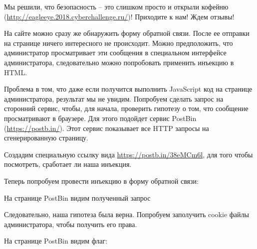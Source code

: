 
Мы решили, что безопасность – это слишком просто и открыли кофейню (\url{http://eagleeye.2018.cyberchallenge.ru/})! Приходите к нам! Ждем отзывы!

\solutionSection

На сайте можно сразу же обнаружить форму обратной связи. После ее отправки на странице ничего интересного не происходит. Можно предположить, что администратор просматривает эти сообщения в специальном интерфейсе администратора, следовательно можно попробовать применить инъекцию в HTML.

Проблема в том, что даже если получится выполнить JavaScript код на странице администратора, результат мы не увидим. Попробуем сделать запрос на сторонний сервис, чтобы, для начала, проверить гипотезу о том, что сообщение просматривают в браузере. Для этого подойдет сервис PostBin (\url{https://postb.in/}). Этот сервис показывает все HTTP запросы на сгенерированную страницу.

Создадим специальную ссылку вида \url{https://postb.in/38eMCm6l}, для того чтобы посмотреть, сработает ли наша инъекция.

Теперь попробуем провести инъекцию в форму обратной связи:


На странице PostBin видим полученный запрос


Следовательно, наша гипотеза была верна. Попробуем заполучить cookie файлы администратора, чтобы получить его права.


На странице PostBin видим флаг:


